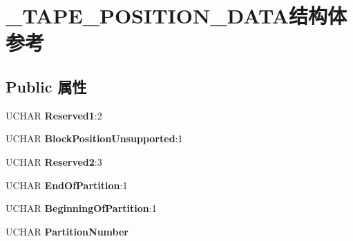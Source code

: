 \hypertarget{struct___t_a_p_e___p_o_s_i_t_i_o_n___d_a_t_a}{}\section{\+\_\+\+T\+A\+P\+E\+\_\+\+P\+O\+S\+I\+T\+I\+O\+N\+\_\+\+D\+A\+T\+A结构体 参考}
\label{struct___t_a_p_e___p_o_s_i_t_i_o_n___d_a_t_a}
\subsection*{Public 属性}
\begin{DoxyCompactItemize}
\item 
\mbox{\label{struct___t_a_p_e___p_o_s_i_t_i_o_n___d_a_t_a_a9058d8e28024024593a2657332932f4c}} 
U\+C\+H\+AR {\bfseries Reserved1}\+:2
\item 
\mbox{\label{struct___t_a_p_e___p_o_s_i_t_i_o_n___d_a_t_a_a64a5d4385d6d5dfab4f9f279928daf57}} 
U\+C\+H\+AR {\bfseries Block\+Position\+Unsupported}\+:1
\item 
\mbox{\label{struct___t_a_p_e___p_o_s_i_t_i_o_n___d_a_t_a_a614338385fd34f236fdc321b73c7c843}} 
U\+C\+H\+AR {\bfseries Reserved2}\+:3
\item 
\mbox{\label{struct___t_a_p_e___p_o_s_i_t_i_o_n___d_a_t_a_a4dbb75cf47077c75c35d9c8d7c7048da}} 
U\+C\+H\+AR {\bfseries End\+Of\+Partition}\+:1
\item 
\mbox{\label{struct___t_a_p_e___p_o_s_i_t_i_o_n___d_a_t_a_a55c05f350ee150a3451ce60b398be74e}} 
U\+C\+H\+AR {\bfseries Beginning\+Of\+Partition}\+:1
\item 
\mbox{\label{struct___t_a_p_e___p_o_s_i_t_i_o_n___d_a_t_a_a395e95bbd39aa51b68f530a3c59beff8}} 
U\+C\+H\+AR {\bfseries Partition\+Number}
\item 
\mbox{\label{struct___t_a_p_e___p_o_s_i_t_i_o_n___d_a_t_a_ae56f79adc59fe56fc9c9d4bed2acb5d8}} 

\end{DoxyCompactItemize}
